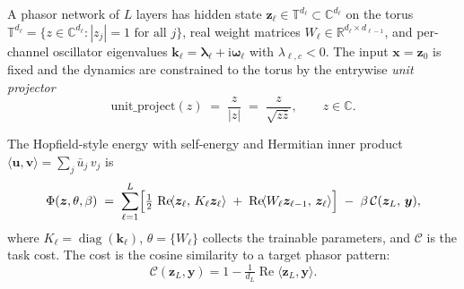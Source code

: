 \documentclass[11pt]{article}
\newcommand{\R}{\mathbb{R}}
\newcommand{\C}{\mathbb{C}}
\newcommand{\T}{\mathbb{T}}
\newcommand{\im}{\mathrm{i}}
\theoremstyle{definition}
\DeclareMathOperator{\diag}{diag}
\DeclareMathOperator{\Real}{Re}
\begin{document}
A phasor network of $L$ layers has hidden state
$\bm{z}_\ell \in \T^{d_\ell} \subset \C^{d_\ell}$ on the torus
$\T^{d_\ell} = \{z\in\C^{d_\ell} : |z_j|=1 \text{ for all } j\}$,
real weight matrices
$W_\ell \in \R^{d_\ell \times d_{\ell-1}}$, and per-channel
oscillator eigenvalues $\bm{k}_\ell = \bm{\lambda}_\ell + \im\bm{\omega}_\ell$
with $\lambda_{\ell,c} < 0$.  The input $\bm{x} = \bm{z}_0$ is fixed
and the dynamics are constrained to the torus by the entrywise
\emph{unit projector}
\begin{equation}\label{eq:unit-project}
  \mathrm{unit\_project}(z)
  \;=\; \frac{z}{|z|}
  \;=\; \frac{z}{\sqrt{z\bar z}},
  \qquad z \in \C.
\end{equation}

The Hopfield-style energy with self-energy and Hermitian inner
product $\langle\bm{u},\bm{v}\rangle = \sum_j \bar u_j\, v_j$ is
\begin{equation}\label{eq:energy}
  \Phi(\bm{z},\theta,\beta)
  \;=\;
  \sum_{\ell=1}^{L}
    \Bigl[
      \tfrac{1}{2}\,\Real\!\langle\bm{z}_\ell,\,K_\ell\bm{z}_\ell\rangle
      \;+\;
      \Real\!\langle W_\ell\bm{z}_{\ell-1},\,\bm{z}_\ell\rangle
    \Bigr]
  \;-\;
  \beta\,\mathcal{C}(\bm{z}_L,\,\bm{y}),
\end{equation}
where $K_\ell = \diag(\bm{k}_\ell)$, $\theta=\{W_\ell\}$ collects the
trainable parameters, and $\mathcal{C}$ is the task cost.  The cost
is the cosine similarity to a target phasor pattern:
\begin{equation}\label{eq:cost}
  \mathcal{C}(\bm{z}_L,\bm{y}) = 1 - \tfrac{1}{d_L}\Real\langle\bm{z}_L,\bm{y}\rangle.
\end{equation}
\end{document}
